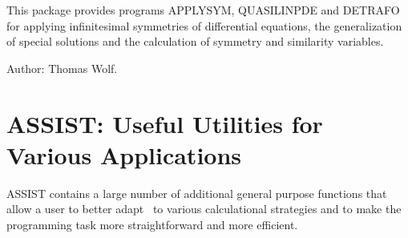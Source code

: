 This package provides programs APPLYSYM, QUASILINPDE and DETRAFO for
applying infinitesimal symmetries of differential equations, the
generalization of special solutions and the calculation of symmetry and
similarity variables.

Author: Thomas Wolf.



\iffalse
\newpage

\section{ARNUM: An Algebraic Number Package}
\label{sec:package-arnum}
\indexpackage{ARNUM}


This package provides facilities for handling algebraic numbers as
polynomial coefficients in {\REDUCE} calculations. It includes facilities for
introducing indeterminates to represent algebraic numbers, for calculating
splitting fields, and for factoring and finding greatest common divisors
in such domains.

Author: Eberhard Schr\"ufer.


\fi

\iffalse
\newpage

\section{ASSERT: Dynamic Verification of Assertions on Function Types}
\indexpackage{ASSERT}
\label{ASSERT}

ASSERT admits to add to symbolic mode RLISP code assertions (partly)
specifying \emph{types} of the arguments and results of RLISP expr
procedures. These types can be associated with functions testing the
validity of the respective arguments during runtime.

Author: Thomas Sturm.



\fi

\newpage

\section{ASSIST: Useful Utilities for Various Applications}
\label{ASSIST}\hypertarget{ASSIST}{}

ASSIST contains a large number of additional general purpose functions
that allow a user to better adapt \REDUCE\ to various calculational
strategies and to make the programming task more straightforward and more
efficient.


